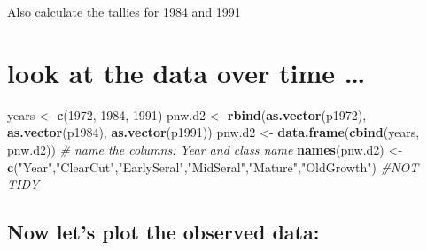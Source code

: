 \documentclass[
]{article}
\newenvironment{Shaded}{\begin{snugshade}}{\end{snugshade}}
\newcommand{\CommentTok}[1]{\textcolor[rgb]{0.56,0.35,0.01}{\textit{#1}}}
\newcommand{\DecValTok}[1]{\textcolor[rgb]{0.00,0.00,0.81}{#1}}
\newcommand{\FunctionTok}[1]{\textcolor[rgb]{0.13,0.29,0.53}{\textbf{#1}}}
\newcommand{\NormalTok}[1]{#1}
\newcommand{\OtherTok}[1]{\textcolor[rgb]{0.56,0.35,0.01}{#1}}
\newcommand{\SpecialCharTok}[1]{\textcolor[rgb]{0.81,0.36,0.00}{\textbf{#1}}}
\newcommand{\StringTok}[1]{\textcolor[rgb]{0.31,0.60,0.02}{#1}}
\begin{document}
Also calculate the tallies for 1984 and 1991

\begin{Shaded}
\end{Shaded}

\section{look at the data over time
\ldots{}}\label{look-at-the-data-over-time}

\begin{Shaded}
\begin{Highlighting}[]
\NormalTok{years }\OtherTok{\textless{}{-}} \FunctionTok{c}\NormalTok{(}\DecValTok{1972}\NormalTok{, }\DecValTok{1984}\NormalTok{, }\DecValTok{1991}\NormalTok{)}
\NormalTok{pnw.d2 }\OtherTok{\textless{}{-}} \FunctionTok{rbind}\NormalTok{(}\FunctionTok{as.vector}\NormalTok{(p1972), }\FunctionTok{as.vector}\NormalTok{(p1984), }\FunctionTok{as.vector}\NormalTok{(p1991))}
\NormalTok{pnw.d2 }\OtherTok{\textless{}{-}} \FunctionTok{data.frame}\NormalTok{(}\FunctionTok{cbind}\NormalTok{(years, pnw.d2))}
  \CommentTok{\# name the columns: Year and class name}
\FunctionTok{names}\NormalTok{(pnw.d2) }\OtherTok{\textless{}{-}} \FunctionTok{c}\NormalTok{(}\StringTok{"Year"}\NormalTok{,}\StringTok{"ClearCut"}\NormalTok{,}\StringTok{"EarlySeral"}\NormalTok{,}\StringTok{"MidSeral"}\NormalTok{,}\StringTok{"Mature"}\NormalTok{,}\StringTok{"OldGrowth"}\NormalTok{)  }\CommentTok{\#NOT TIDY}
\end{Highlighting}
\end{Shaded}

\subsection{Now let's plot the observed
data:}\label{now-lets-plot-the-observed-data}
\end{document}
